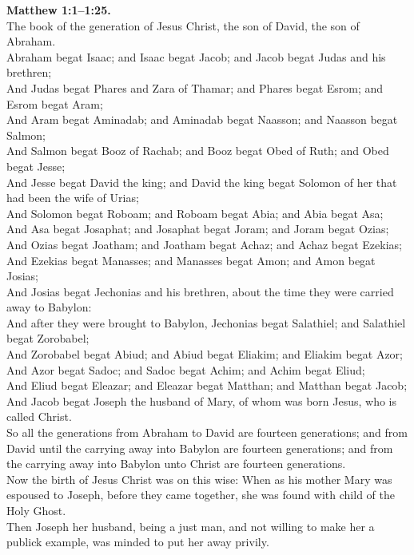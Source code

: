\documentclass[8pt]{article} %
\begin{document}
{\begin{minipage}[t]{0.45\textwidth}
\textbf{Matthew 1:1--1:25.}\\
The book of the generation of Jesus Christ, the son of David, the son of Abraham.\\
Abraham begat Isaac; and Isaac begat Jacob; and Jacob begat Judas and his brethren;\\
And Judas begat Phares and Zara of Thamar; and Phares begat Esrom; and Esrom begat Aram;\\
And Aram begat Aminadab; and Aminadab begat Naasson; and Naasson begat Salmon;\\
And Salmon begat Booz of Rachab; and Booz begat Obed of Ruth; and Obed begat Jesse;\\
And Jesse begat David the king; and David the king begat Solomon of her that had been the wife of Urias;\\
And Solomon begat Roboam; and Roboam begat Abia; and Abia begat Asa;\\
And Asa begat Josaphat; and Josaphat begat Joram; and Joram begat Ozias;\\
And Ozias begat Joatham; and Joatham begat Achaz; and Achaz begat Ezekias;\\
And Ezekias begat Manasses; and Manasses begat Amon; and Amon begat Josias;\\
And Josias begat Jechonias and his brethren, about the time they were carried away to Babylon:\\
And after they were brought to Babylon, Jechonias begat Salathiel; and Salathiel begat Zorobabel;\\
And Zorobabel begat Abiud; and Abiud begat Eliakim; and Eliakim begat Azor;\\
And Azor begat Sadoc; and Sadoc begat Achim; and Achim begat Eliud;\\
And Eliud begat Eleazar; and Eleazar begat Matthan; and Matthan begat Jacob;\\
And Jacob begat Joseph the husband of Mary, of whom was born Jesus, who is called Christ.\\
So all the generations from Abraham to David are fourteen generations; and from David until the carrying away into Babylon are fourteen generations; and from the carrying away into Babylon unto Christ are fourteen generations.\\
Now the birth of Jesus Christ was on this wise: When as his mother Mary was espoused to Joseph, before they came together, she was found with child of the Holy Ghost.\\
Then Joseph her husband, being a just man, and not willing to make her a publick example, was minded to put her away privily.\\

\end{minipage}}
\end{document}
